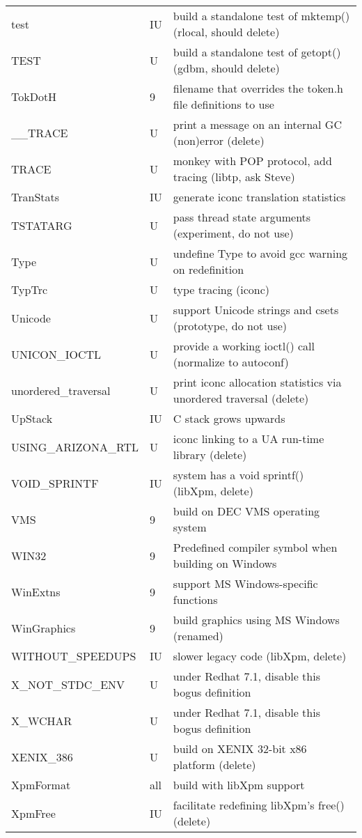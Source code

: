 \begin{xtabular}{|m{1.8in}|m{0.5in}|m{4.0in}|}
test & IU & build a standalone test of mktemp() (rlocal, should delete) \\
TEST & U & build a standalone test of getopt() (gdbm, should delete) \\
TokDotH & 9 & filename that overrides the token.h file definitions to use \\
\_\_TRACE & U & print a message on an internal GC (non)error (delete) \\
TRACE & U & monkey with POP protocol, add tracing (libtp, ask Steve) \\
TranStats & IU & generate iconc translation statistics \\
TSTATARG & U & pass thread state arguments (experiment, do not use) \\
Type & U & undefine Type to avoid gcc warning on redefinition \\
TypTrc & U & type tracing (iconc) \\
Unicode & U & support Unicode strings and csets (prototype, do not use) \\
UNICON\_IOCTL & U & provide a working ioctl() call (normalize to autoconf) \\
unordered\_traversal & U & print iconc allocation statistics via unordered traversal (delete) \\
UpStack & IU & C stack grows upwards \\
USING\_ARIZONA\_RTL & U & iconc linking to a UA run-time library (delete) \\
VOID\_SPRINTF & IU & system has a void sprintf() (libXpm, delete) \\
VMS & 9 & build on DEC VMS operating system \\
WIN32 & 9 & Predefined compiler symbol when building  on Windows \\
WinExtns & 9 & support MS Windows-specific functions \\
WinGraphics & 9 & build graphics using MS Windows (renamed) \\
WITHOUT\_SPEEDUPS & IU & slower legacy code (libXpm, delete) \\
X\_NOT\_STDC\_ENV & U & under Redhat 7.1, disable this bogus definition \\
X\_WCHAR & U & under Redhat 7.1, disable this bogus definition \\
XENIX\_386 & U & build on XENIX 32-bit x86 platform (delete) \\
XpmFormat & all & build with libXpm support \\
XpmFree & IU & facilitate redefining libXpm's free()  (delete) \\

\end{xtabular}
